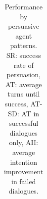 \begin{table}[ht]
\begin{tabular}{lcccc ccccc ccccc}
        \bottomrule
    \end{tabular}
    \caption{Performance by persuasive agent patterns. SR: success rate of persuasion, AT: average turns until success, AT-SD: AT in successful dialogues only, AII: average intention improvement in failed dialogues.}
    \label{tab:result}
\end{table}

\setlength{\tabcolsep}{6pt} %
